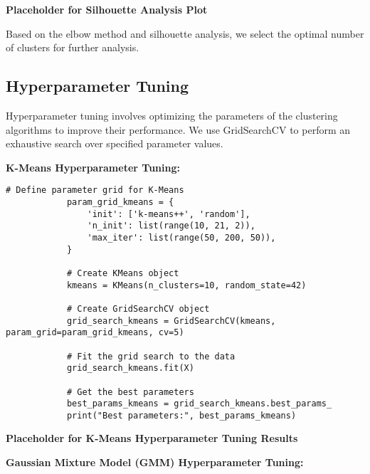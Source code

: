         \textbf{Placeholder for Silhouette Analysis Plot}

        Based on the elbow method and silhouette analysis, we select the optimal number of clusters for further analysis.
            
    \subsection{Hyperparameter Tuning}
    
        Hyperparameter tuning involves optimizing the parameters of the clustering algorithms to improve their performance. We use GridSearchCV to perform an exhaustive search over specified parameter values.

        \textbf{K-Means Hyperparameter Tuning:}

        \begin{lstlisting}[caption={Grid Search for k-Means Clustering}, label={lst:grid_search_kmeans}]
            # Define parameter grid for K-Means
            param_grid_kmeans = {
                'init': ['k-means++', 'random'],
                'n_init': list(range(10, 21, 2)),
                'max_iter': list(range(50, 200, 50)),
            }
            
            # Create KMeans object
            kmeans = KMeans(n_clusters=10, random_state=42)
            
            # Create GridSearchCV object
            grid_search_kmeans = GridSearchCV(kmeans, param_grid=param_grid_kmeans, cv=5)
            
            # Fit the grid search to the data
            grid_search_kmeans.fit(X)
            
            # Get the best parameters
            best_params_kmeans = grid_search_kmeans.best_params_
            print("Best parameters:", best_params_kmeans)
        \end{lstlisting}
        
        \vspace{1em}

        \textbf{Placeholder for K-Means Hyperparameter Tuning Results}

        \textbf{Gaussian Mixture Model (GMM) Hyperparameter Tuning:}

